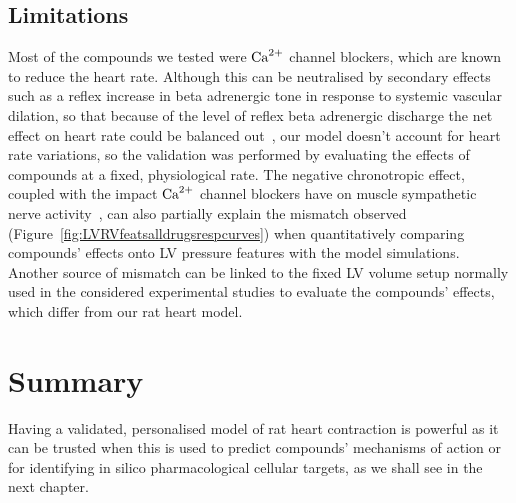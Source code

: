 \subsection{Limitations}\label{sec:ch6limitations}
Most of the compounds we tested were $\textrm{Ca}^{2+}$ channel blockers, which are known to reduce the heart rate. Although this can be neutralised by secondary effects such as a reflex increase in beta adrenergic tone in response to systemic vascular dilation, so that because of the level of reflex beta adrenergic discharge the net effect on heart rate could be balanced out~\cite{Low:1982}, our model doesn't account for heart rate variations, so the validation was performed by evaluating the effects of compounds at a fixed, physiological rate. The negative chronotropic effect, coupled with the impact $\textrm{Ca}^{2+}$ channel blockers have on muscle sympathetic nerve activity~\cite{Binggeli:2002}, can also partially explain the mismatch observed (Figure~\ref{fig:LVRVfeatsalldrugsrespcurves}) when quantitatively comparing compounds' effects onto LV pressure features with the model simulations. Another source of mismatch can be linked to the fixed LV volume setup normally used in the considered experimental studies to evaluate the compounds' effects, which differ from our rat heart model.


%
%
%
\section{Summary}\label{sec:ch6summary}
Having a validated, personalised model of rat heart contraction is powerful as it can be trusted when this is used to predict compounds' mechanisms of action or for identifying in silico pharmacological cellular targets, as we shall see in the next chapter.